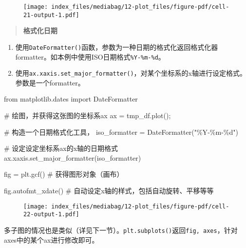 \documentclass[
  letterpaper,
  DIV=11,
  numbers=noendperiod]{scrreprt}
\newenvironment{Shaded}{\begin{snugshade}}{\end{snugshade}}
\newcommand{\CommentTok}[1]{\textcolor[rgb]{0.37,0.37,0.37}{#1}}
\newcommand{\ImportTok}[1]{\textcolor[rgb]{0.00,0.46,0.62}{#1}}
\newcommand{\NormalTok}[1]{\textcolor[rgb]{0.00,0.23,0.31}{#1}}
\newcommand{\OperatorTok}[1]{\textcolor[rgb]{0.37,0.37,0.37}{#1}}
\newcommand{\SpecialCharTok}[1]{\textcolor[rgb]{0.37,0.37,0.37}{#1}}
\newcommand{\StringTok}[1]{\textcolor[rgb]{0.13,0.47,0.30}{#1}}
\providecommand{\tightlist}{%
  \setlength{\itemsep}{0pt}\setlength{\parskip}{0pt}}\usepackage{longtable,booktabs,array}
\begin{document}
\begin{figure}[H]

{\centering \texttt{[image: index\_files/mediabag/12-plot\_files/figure-pdf/cell-21-output-1.pdf]}

}

\end{figure}

\begin{quote}
\textbf{格式化日期}
\end{quote}

\begin{enumerate}
\def\labelenumi{\arabic{enumi}.}
\tightlist
\item
  使用\texttt{DateFormatter()}函数，参数为一种日期的格式化返回格式化器formatter。如本例中使用ISO日期格式\texttt{\%Y-\%m-\%d}。
\item
  使用\texttt{ax.xaxis.set\_major\_formatter()}，对某个坐标系的x轴进行设定格式。参数是一个formatter。
\end{enumerate}

\begin{Shaded}
\begin{Highlighting}[]
\ImportTok{from}\NormalTok{ matplotlib.dates }\ImportTok{import}\NormalTok{ DateFormatter}

\CommentTok{\# 绘图，并获得这张图的坐标系ax}
\NormalTok{ax }\OperatorTok{=}\NormalTok{ tmp\_df.plot()}\OperatorTok{;}

\CommentTok{\# 构造一个日期格式化工具，}
\NormalTok{iso\_formatter }\OperatorTok{=}\NormalTok{ DateFormatter(}\StringTok{"\%Y{-}\%m{-}}\SpecialCharTok{\%d}\StringTok{"}\NormalTok{)}

\CommentTok{\# 设定设定坐标系ax的x轴的日期格式}
\NormalTok{ax.xaxis.set\_major\_formatter(iso\_formatter)}

\NormalTok{fig }\OperatorTok{=}\NormalTok{ plt.gcf() }\CommentTok{\# 获得图形对象（画布）}

\NormalTok{fig.autofmt\_xdate() }\CommentTok{\# 自动设定x轴的样式，包括自动旋转、平移等等}
\end{Highlighting}
\end{Shaded}

\begin{figure}[H]

{\centering \texttt{[image: index\_files/mediabag/12-plot\_files/figure-pdf/cell-22-output-1.pdf]}

}

\end{figure}

多子图的情况也是类似（详见下一节）。\texttt{plt.subplots()}返回\texttt{fig,\ axes}，针对axes中的某个ax进行修改即可。
\end{document}
